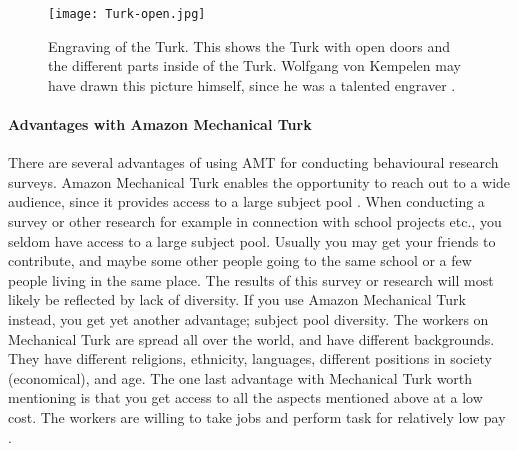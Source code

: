 \begin{figure}[h!]
\centering
\texttt{[image: Turk-open.jpg]}
\caption{Engraving of the Turk. This shows the Turk with open doors and the different parts inside of the Turk. Wolfgang von Kempelen may have drawn this picture himself, since he was a talented engraver \cite{theturk}.}
\end{figure}

\paragraph{Advantages with Amazon Mechanical Turk}
There are several advantages of using AMT for conducting behavioural research surveys. Amazon Mechanical Turk enables the opportunity to reach out to a wide audience, since it provides access to a large subject pool \cite{AMT}. When conducting a survey or other research for example in connection with school projects etc., you seldom have access to a large subject pool. Usually you may get your friends to contribute, and maybe some other people going to the same school or a few people living in the same place. The results of this survey or research will most likely be reflected by lack of diversity. If you use Amazon Mechanical Turk instead, you get yet another advantage; subject pool diversity. The workers on Mechanical Turk are spread all over the world, and have different backgrounds. They have different religions, ethnicity, languages, different positions in society (economical), and age. The one last advantage with Mechanical Turk worth mentioning is that you get access to all the aspects mentioned above at a low cost. The workers are willing to take jobs and perform task for relatively low pay \cite{AMT}.

